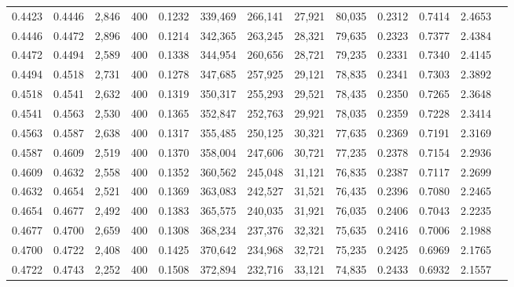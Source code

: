 \begin{tabular}{rrrrrrrrrrrrr}
0.4423 & 0.4446 &  2,846 & 400 &                                     0.1232 & 339,469 & 266,141 &  27,921 &  80,035 & 0.2312 & 0.7414 & 2.4653 \\
0.4446 & 0.4472 &  2,896 & 400 &                                     0.1214 & 342,365 & 263,245 &  28,321 &  79,635 & 0.2323 & 0.7377 & 2.4384 \\
0.4472 & 0.4494 &  2,589 & 400 &                                     0.1338 & 344,954 & 260,656 &  28,721 &  79,235 & 0.2331 & 0.7340 & 2.4145 \\
0.4494 & 0.4518 &  2,731 & 400 &                                     0.1278 & 347,685 & 257,925 &  29,121 &  78,835 & 0.2341 & 0.7303 & 2.3892 \\
0.4518 & 0.4541 &  2,632 & 400 &                                     0.1319 & 350,317 & 255,293 &  29,521 &  78,435 & 0.2350 & 0.7265 & 2.3648 \\
0.4541 & 0.4563 &  2,530 & 400 &                                     0.1365 & 352,847 & 252,763 &  29,921 &  78,035 & 0.2359 & 0.7228 & 2.3414 \\
0.4563 & 0.4587 &  2,638 & 400 &                                     0.1317 & 355,485 & 250,125 &  30,321 &  77,635 & 0.2369 & 0.7191 & 2.3169 \\
0.4587 & 0.4609 &  2,519 & 400 &                                     0.1370 & 358,004 & 247,606 &  30,721 &  77,235 & 0.2378 & 0.7154 & 2.2936 \\
0.4609 & 0.4632 &  2,558 & 400 &                                     0.1352 & 360,562 & 245,048 &  31,121 &  76,835 & 0.2387 & 0.7117 & 2.2699 \\
0.4632 & 0.4654 &  2,521 & 400 &                                     0.1369 & 363,083 & 242,527 &  31,521 &  76,435 & 0.2396 & 0.7080 & 2.2465 \\
0.4654 & 0.4677 &  2,492 & 400 &                                     0.1383 & 365,575 & 240,035 &  31,921 &  76,035 & 0.2406 & 0.7043 & 2.2235 \\
0.4677 & 0.4700 &  2,659 & 400 &                                     0.1308 & 368,234 & 237,376 &  32,321 &  75,635 & 0.2416 & 0.7006 & 2.1988 \\
0.4700 & 0.4722 &  2,408 & 400 &                                     0.1425 & 370,642 & 234,968 &  32,721 &  75,235 & 0.2425 & 0.6969 & 2.1765 \\
0.4722 & 0.4743 &  2,252 & 400 &                                     0.1508 & 372,894 & 232,716 &  33,121 &  74,835 & 0.2433 & 0.6932 & 2.1557 \\

\end{tabular}
